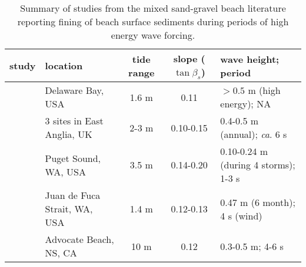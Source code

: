 \begin{landscape}
\begin{table}[tbp!]
	\caption[Mixed sand-gravel beaches: summary of reported beach surface fining during storms]{Summary of studies from the mixed sand-gravel beach literature reporting fining of beach surface sediments during periods of high energy wave forcing.\label{table:beach_summary}} 
	\centering
	\begin{tabular}{llccl}
		\hline
		study & location & tide range & slope ($\tan\beta_s$) & wave height; period\\
		\hline
		\citet{Nordstrom_Jackson1993} & Delaware Bay, USA & 1.6 m & 0.11 & $>0.5$ m (high energy); NA\\
		\citet{Pontee_etal2004} & 3 sites in East Anglia, UK & 2-3 m & 0.10-0.15 & 0.4-0.5 m (annual); \textit{ca}. 6 s\\
		\citet{Curtiss_etal2009} & Puget Sound, WA, USA & 3.5 m & 0.14-0.20 & 0.10-0.24 m (during 4 storms); 1-3 s\\
		\citet{Miller_etal2011} & Juan de Fuca Strait, WA, USA & 1.4 m & 0.12-0.13 & 0.47 m (6 month); 4 s (wind)\\%
		\citet{Hay_etal2014} & Advocate Beach, NS, CA & 10 m & 0.12 & 0.3-0.5 m; 4-6 s\\
		\hline
	\end{tabular}
\end{table}
\end{landscape}

